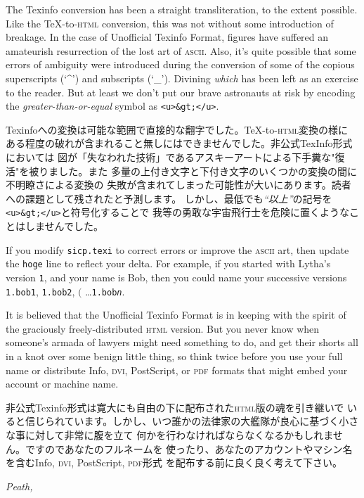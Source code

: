 \documentclass[8pt,oneside]{book}
\newcommand{\acronym}[1]{\textsc{\MakeLowercase{#1}}}
\newcommand{\code}[1]{\texttt{#1}}
\begin{document}
The Texinfo conversion has been a straight transliteration, to the extent
possible.  Like the {\TeX}-to-\acronym{HTML} conversion, this was not without
some introduction of breakage.  In the case of Unofficial Texinfo Format,
figures have suffered an amateurish resurrection of the lost art of
\acronym{ASCII}.  Also, it's quite possible that some errors of ambiguity
were introduced during the conversion of some of the copious superscripts (`\^{}')
and subscripts (`\_').  Divining \emph{which} has been left as an exercise to
the reader. But at least we don't put our brave astronauts at risk by encoding
the \emph{greater-than-or-equal} symbol as \code{<u>\&gt;</u>}.

Texinfoへの変換は可能な範囲で直接的な翻字でした。{\TeX}-to-\acronym{HTML}変換の様に
ある程度の破れが含まれること無しにはできませんでした。非公式TexInfo形式においては
図が「失なわれた技術」であるアスキーアートによる下手糞な"復活"を被りました。また
多量の上付き文字と下付き文字のいくつかの変換の間に不明瞭さによる変換の
失敗が含まれてしまった可能性が大いにあります。読者への課題として残されたと予測します。
しかし、最低でも\emph{``以上''}の記号を\texttt{<u>\&gt;</u>}と符号化することで
我等の勇敢な宇宙飛行士を危険に置くようなことはしませんでした。

If you modify \texttt{sicp.texi} to correct errors or improve the
\acronym{ASCII} art, then update the \code{hoge}
line to reflect your delta.  For example, if you started with Lytha's version
\code{1}, and your name is Bob, then you could name your successive versions
\code{1.bob1}, \code{1.bob2}, $($ \dots \code{1.bob\textit{n}}. 

It is believed that the Unofficial Texinfo Format is in keeping with the
spirit of the graciously freely-distributed \acronym{HTML} version.  But you
never know when someone's armada of lawyers might need something to do, and get
their shorts all in a knot over some benign little thing, so think twice before
you use your full name or distribute Info, \acronym{DVI}, PostScript, or
\acronym{PDF} formats that might embed your account or machine name.

非公式Texinfo形式は寛大にも自由の下に配布された\acronym{HTML}版の魂を引き継いで
いると信じられています。しかし、いつ誰かの法律家の大艦隊が良心に基づく小さな事に対して非常に腹を立て
何かを行わなければならなくなるかもしれません。ですのであなたのフルネームを
使ったり、あなたのアカウントやマシン名を含むInfo, \acronym{DVI}, PostScript, \acronym{PDF}形式
を配布する前に良く良く考えて下さい。

\noindent
\textit{Peath,}
\end{document}

